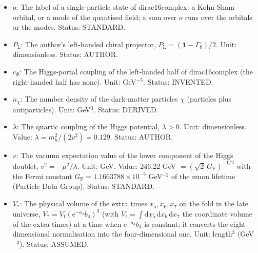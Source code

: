 \documentclass[
  10pt,
]{article}
\begin{document}
\begin{itemize}
  \(\bar\chi_o = \chi_o^\dagger\sigma_{16}\) is its Dirac adjoint. Unit:
  GeV\(^{1/2}\). Status: DERIVED.
\item
  \(o\): The label of a single-particle state of dirac16complex: a
  Kohn-Sham orbital, or a mode of the quantised field; a sum over \(o\)
  runs over the orbitals or the modes. Status: STANDARD.
\item
  \(P_{\mathrm{L}}\): The author's left-handed chiral projector,
  \(P_{\mathrm{L}} = (\mathbf{1} - \Gamma_8)/2\). Unit: dimensionless.
  Status: AUTHOR.
\item
  \(c_\Phi\): The Higgs-portal coupling of the left-handed half of
  dirac16complex (the right-handed half has none). Unit: GeV\(^{-5}\).
  Status: INVENTED.
\item
  \(n_\chi\): The number density of the dark-matter particles \(\chi\)
  (particles plus antiparticles). Unit: GeV\(^3\). Status: DERIVED.
\item
  \(\lambda\): The quartic coupling of the Higgs potential,
  \(\lambda > 0\). Unit: dimensionless. Value:
  \(\lambda = m_h^2/(2v^2) = 0.129\). Status: AUTHOR.
\item
  \(v\): The vacuum expectation value of the lower component of the
  Higgs doublet, \(v^2 = -\mu^2/\lambda\). Unit: GeV. Value: 246.22 GeV
  \(= (\sqrt2\,G_{\mathrm{F}})^{-1/2}\) with the Fermi constant
  \(G_{\mathrm{F}} = 1.1663788\times10^{-5}\) GeV\(^{-2}\) of the muon
  lifetime (Particle Data Group). Status: STANDARD.
\item
  \(V_*\): The physical volume of the extra times \(x_5, x_6, x_7\) on
  the fold in the late universe,
  \(V_* = V_{\mathrm{t}}(\mathrm{e}^{-a_4}b_4)^3\) (with
  \(V_{\mathrm{t}} = \int\mathrm{d}x_5\,\mathrm{d}x_6\,\mathrm{d}x_7\)
  the coordinate volume of the extra times) at a time when
  \(\mathrm{e}^{-a_4}b_4\) is constant; it converts the
  eight-dimensional normalisation into the four-dimensional one. Unit:
  length\(^3\) (GeV\(^{-3}\)). Status: ASSUMED.
\end{itemize}
\end{document}
